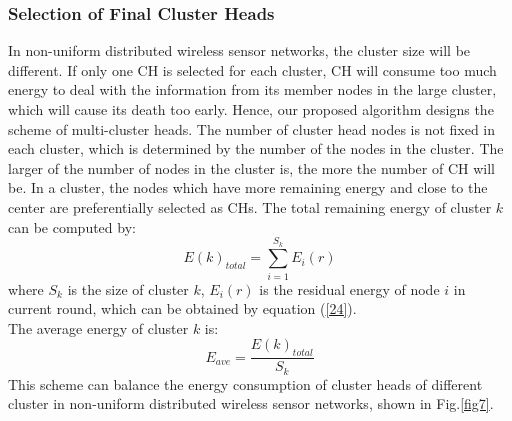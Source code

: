 \documentclass[11pt]{report}
\begin{document}
	\subsubsection{Selection of Final Cluster Heads}
	
	In non-uniform distributed wireless sensor networks, the cluster size will be different. If only one CH is selected for each cluster, CH will consume too much energy to deal with the information from its member nodes in the large cluster, which will cause its death too early. Hence, our proposed algorithm designs the scheme of multi-cluster heads. The number of cluster head nodes is not fixed in each cluster, which is determined by the number of the nodes in the cluster. The larger of the number of nodes in the cluster is, the more the number of CH will be. In a cluster, the nodes which have more remaining energy and close to the center are preferentially selected as CHs. The total remaining energy of cluster $k$ can be computed by:
	\begin{equation}
	E\left(k\right)_{total} = \sum_{i=1}^{S_k}E_i\left(r\right)
	\end{equation}
	where $S_k$ is the size of cluster $k$, $E_i\left(r\right)$ is the residual energy of node $i$ in current round, which can be obtained by equation (\ref{24}).\\
	The average energy of cluster $k$ is:
	\begin{equation}
	E_{ave} = \frac{E\left(k\right)_{total}}{S_k}
	\end{equation}
	\noindent This scheme can balance the energy consumption of cluster heads of different cluster in non-uniform distributed wireless sensor networks, shown in Fig.\ref{fig7}. \\
	
\end{document}
